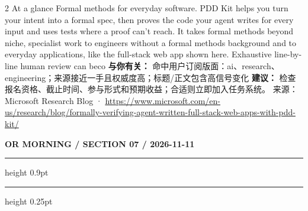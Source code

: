 \documentclass[10.5pt]{ctexart}
\begin{document}
\begin{multicols}{2}
At a glance Formal methods for everyday software. PDD Kit helps you turn your intent into a formal spec, then proves the code your agent writes for every input and uses tests where a proof can’t reach. It takes formal methods beyond niche, specialist work to engineers without a formal methods background and to everyday applications, like the full-stack web app shown here. Exhaustive line-by-line human review can beco
\textbf{与你有关：} 命中用户订阅版面：ai、research、engineering；来源接近一手且权威度高；标题/正文包含高信号变化
\textbf{建议：} 检查报名资格、截止时间、参与形式和预期收益；合适则立即加入任务系统。
{\footnotesize\color{ormuted} 来源：Microsoft Research Blog · \url{https://www.microsoft.com/en-us/research/blog/formally-verifying-agent-written-full-stack-web-apps-with-pdd-kit/}}
\end{multicols}
\newpage
{\small\bfseries OR MORNING / SECTION 07 / 2026-11-11}
\vspace{2mm}
\hrule height 0.9pt
\vspace{1.5mm}
\hrule height 0.25pt
\vspace{4mm}
\end{document}
